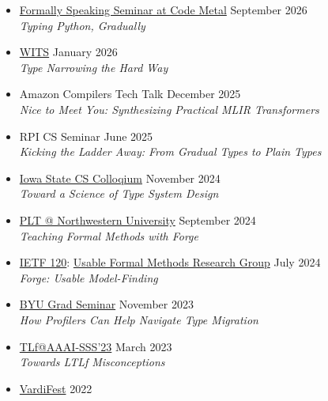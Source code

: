 \documentclass[11pt]{article}
\begin{document}
\begin{itemize}
  \item
    \href{https://www.codemetal.ai/research/formally-speaking}{Formally Speaking Seminar at Code Metal} \hfill September 2026 \\
    \emph{Typing Python, Gradually}
  \item
    \href{https://popl26.sigplan.org/home/wits-2026#program}{WITS} \hfill January 2026 \\
    \emph{Type Narrowing the Hard Way}
  \item
    {Amazon Compilers Tech Talk} \hfill December 2025 \\
    \emph{Nice to Meet You: Synthesizing Practical MLIR Transformers}
  \item
    {RPI CS Seminar} \hfill June 2025 \\
    \emph{Kicking the Ladder Away: From Gradual Types to Plain Types}
  \item
    \href{https://www.cs.iastate.edu/event/2024/cs-colloquium-dr-ben-greenman}{Iowa State CS Colloqium} \hfill November 2024 \\
    \emph{Toward a Science of Type System Design}
  \item
    \href{https://plt.cs.northwestern.edu/}{PLT @ Northwestern University} \hfill September 2024 \\
    \emph{Teaching Formal Methods with Forge}
  \item
    \href{https://www.ietf.org/meeting/120/}{IETF 120}: \href{https://datatracker.ietf.org/meeting/120/materials/agenda-120-ufmrg-03}{Usable Formal Methods Research Group} \hfill July 2024 \\
    \emph{Forge: Usable Model-Finding}
  \item
    \href{https://cs.byu.edu/events/seminar-series/}{BYU Grad Seminar} \hfill November 2023 \\
    \emph{How Profilers Can Help Navigate Type Migration}
  \item
    \href{https://ltlf-symposium.github.io/}{TLf@AAAI-SSS'23} \hfill March 2023 \\
    \emph{Towards LTLf Misconceptions}
  \item
    \href{https://vardifest.github.io}{VardiFest} \hfill 2022\\

\end{itemize}
\end{document}
